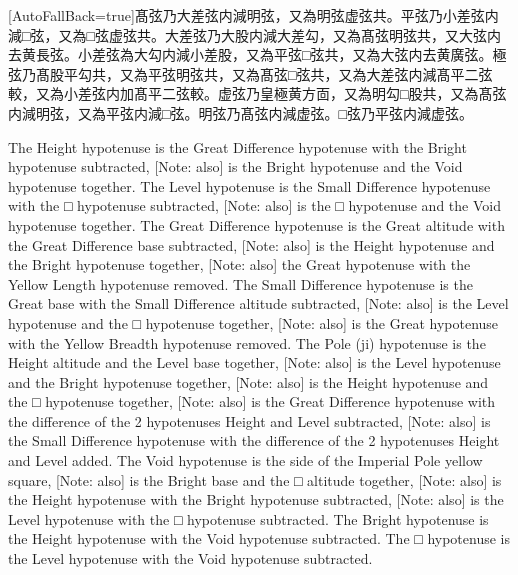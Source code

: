 \documentclass[11pt]{article}
\newcommand{\zhsmall}{\footnotesize\color{black!70}}
\newcommand{\unitlabel}[1]{\marginpar{\raggedleft\tiny\color{gray}#1}}
\newenvironment{unitzh}{\par\CJKfontspec{Noto Serif CJK SC}[AutoFallBack=true]\large\linespread{1.25}\selectfont}{\par}
\newenvironment{uniten}{\par\small\color{black!85}}{\par\medskip}
\begin{document}
\begin{unitzh}\unitlabel{ceyuan-003.12}髙弦乃大差弦内減明弦，{\zhsmall 又}為明弦虚弦共。平弦乃小差弦内減□弦，{\zhsmall 又}為□弦虚弦共。大差弦乃大股内減大差勾，{\zhsmall 又}為髙弦明弦共，{\zhsmall 又}大弦内去黄長弦。小差弦為大勾内減小差股，{\zhsmall 又}為平弦□弦共，{\zhsmall 又}為大弦内去黄廣弦。極弦乃髙股平勾共，{\zhsmall 又}為平弦明弦共，{\zhsmall 又}為髙弦□弦共，{\zhsmall 又}為大差弦内減髙平二弦較，{\zhsmall 又}為小差弦内加髙平二弦較。虚弦乃皇極黄方靣，{\zhsmall 又}為明勾□股共，{\zhsmall 又}為髙弦内減明弦，{\zhsmall 又}為平弦内減□弦。明弦乃髙弦内減虚弦。□弦乃平弦内減虚弦。\end{unitzh}
\begin{uniten}The Height hypotenuse is the Great Difference hypotenuse with the Bright hypotenuse subtracted, [Note: also] is the Bright hypotenuse and the Void hypotenuse together. The Level hypotenuse is the Small Difference hypotenuse with the □ hypotenuse subtracted, [Note: also] is the □ hypotenuse and the Void hypotenuse together. The Great Difference hypotenuse is the Great altitude with the Great Difference base subtracted, [Note: also] is the Height hypotenuse and the Bright hypotenuse together, [Note: also] the Great hypotenuse with the Yellow Length hypotenuse removed. The Small Difference hypotenuse is the Great base with the Small Difference altitude subtracted, [Note: also] is the Level hypotenuse and the □ hypotenuse together, [Note: also] is the Great hypotenuse with the Yellow Breadth hypotenuse removed. The Pole (ji) hypotenuse is the Height altitude and the Level base together, [Note: also] is the Level hypotenuse and the Bright hypotenuse together, [Note: also] is the Height hypotenuse and the □ hypotenuse together, [Note: also] is the Great Difference hypotenuse with the difference of the 2 hypotenuses Height and Level subtracted, [Note: also] is the Small Difference hypotenuse with the difference of the 2 hypotenuses Height and Level added. The Void hypotenuse is the side of the Imperial Pole yellow square, [Note: also] is the Bright base and the □ altitude together, [Note: also] is the Height hypotenuse with the Bright hypotenuse subtracted, [Note: also] is the Level hypotenuse with the □ hypotenuse subtracted. The Bright hypotenuse is the Height hypotenuse with the Void hypotenuse subtracted. The □ hypotenuse is the Level hypotenuse with the Void hypotenuse subtracted.\end{uniten}
\end{document}
